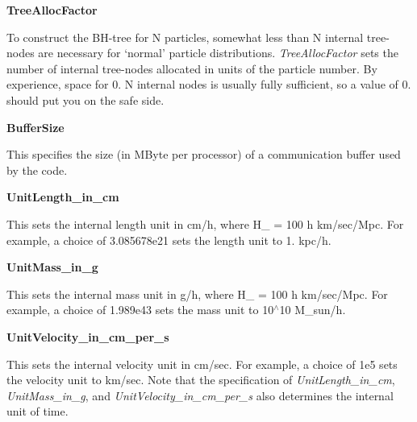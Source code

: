 \begin{DoxyItemize}
\item {\bfseries \-Tree\-Alloc\-Factor} \par
 \-To construct the \-B\-H-\/tree for \-N particles, somewhat less than \-N internal tree-\/nodes are necessary for `normal' particle distributions. {\itshape \-Tree\-Alloc\-Factor\/} sets the number of internal tree-\/nodes allocated in units of the particle number. \-By experience, space for 0. \-N internal nodes is usually fully sufficient, so a value of 0. should put you on the safe side.
\end{DoxyItemize}


\begin{DoxyItemize}
\item {\bfseries \-Buffer\-Size} \par
 \-This specifies the size (in \-M\-Byte per processor) of a communication buffer used by the code.
\end{DoxyItemize}


\begin{DoxyItemize}
\item {\bfseries \-Unit\-Length\-\_\-in\-\_\-cm} \par
 \-This sets the internal length unit in cm/h, where \-H\-\_ = 100 h km/sec/\-Mpc. \-For example, a choice of 3.\-085678e21 sets the length unit to 1. kpc/h.
\end{DoxyItemize}


\begin{DoxyItemize}
\item {\bfseries \-Unit\-Mass\-\_\-in\-\_\-g} \par
 \-This sets the internal mass unit in g/h, where \-H\-\_ = 100 h km/sec/\-Mpc. \-For example, a choice of 1.\-989e43 sets the mass unit to 10$^\wedge$10 \-M\-\_\-sun/h.
\end{DoxyItemize}


\begin{DoxyItemize}
\item {\bfseries \-Unit\-Velocity\-\_\-in\-\_\-cm\-\_\-per\-\_\-s} \par
 \-This sets the internal velocity unit in cm/sec. \-For example, a choice of 1e5 sets the velocity unit to km/sec. \-Note that the specification of {\itshape \-Unit\-Length\-\_\-in\-\_\-cm\/}, {\itshape \-Unit\-Mass\-\_\-in\-\_\-g\/}, and {\itshape \-Unit\-Velocity\-\_\-in\-\_\-cm\-\_\-per\-\_\-s\/} also determines the internal unit of time.
\end{DoxyItemize}


